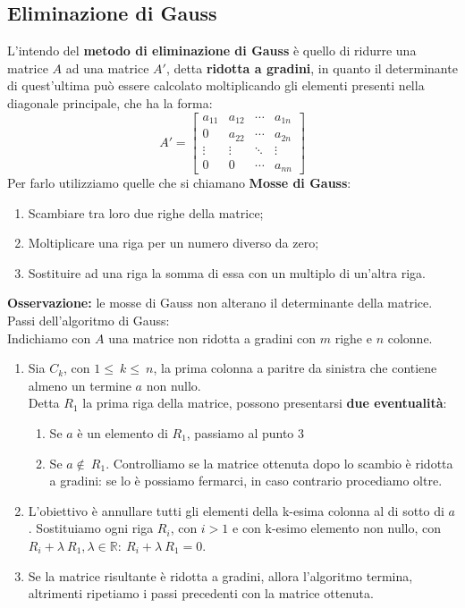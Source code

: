 \documentclass[../main.tex]{subfiles}
\begin{document}
\subsection{Eliminazione di Gauss}
L'intendo del \textbf{metodo di eliminazione di Gauss} è quello di ridurre una
matrice $A$ ad una matrice $A'$, detta \textbf{ridotta a gradini}, in quanto il
determinante di quest'ultima può essere calcolato moltiplicando gli elementi
presenti nella diagonale principale, che ha la forma:
\[
    A' = \begin{bmatrix}
        a_{11} & a_{12} & \cdots & a_{1n} \\
        0      & a_{22} & \cdots & a_{2n} \\
        \vdots & \vdots & \ddots & \vdots \\
        0      & 0      & \cdots & a_{nn}
    \end{bmatrix}
\]
Per farlo utilizziamo quelle che si chiamano \textbf{Mosse di Gauss}:
\begin{enumerate}
    \item Scambiare tra loro due righe della matrice;
    \item Moltiplicare una riga per un numero diverso da zero;
    \item Sostituire ad una riga la somma di essa con un multiplo di un'altra riga.
\end{enumerate}
\textbf{Osservazione:} le mosse di Gauss non alterano il determinante della matrice.\\
Passi dell'algoritmo di Gauss:\\
Indichiamo con $A$ una matrice non ridotta a gradini con $m$ righe e $n$ colonne.
\begin{enumerate}
    \item Sia $C_k$, con $1\leq\ k\leq\ n$, la prima colonna a paritre da sinistra che
          contiene almeno un termine $a$ non nullo.\\ Detta $R_1$ la prima riga della
          matrice, possono presentarsi\textbf{ due eventualità}:
          \begin{enumerate}
              \item Se $a$ è un elemento di $R_1$, passiamo al punto $3$
              \item Se $a\notin\ R_1$. Controlliamo se la matrice ottenuta dopo lo scambio è
                    ridotta a gradini: se lo è possiamo fermarci, in caso contrario procediamo
                    oltre.
          \end{enumerate}
    \item L'obiettivo è annullare tutti gli elementi della k-esima colonna al di sotto di
          $a$. Sostituiamo ogni riga $R_i$, con $i>1$ e con k-esimo elemento non nullo,
          con $R_i+\lambda\ R_1, \lambda\in\mathbb{R}: \ R_i+\lambda\ R_1 = 0$.
    \item Se la matrice risultante è ridotta a gradini, allora l'algoritmo termina,
          altrimenti ripetiamo i passi precedenti con la matrice ottenuta.
\end{enumerate}
\end{document}

